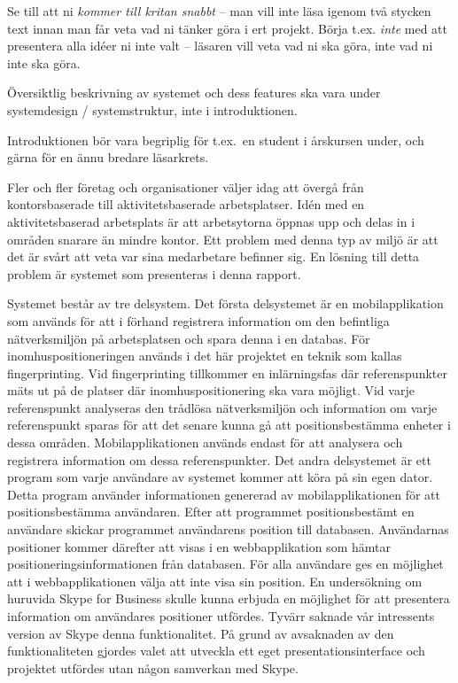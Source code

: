 \documentclass[a4paper,12pt]{article}
\begin{document}
 Se till att ni \emph{kommer till kritan snabbt} – man vill inte läsa igenom två stycken text innan man får veta vad ni tänker göra i ert projekt.  Börja t.ex. \emph{inte} med att presentera alla idéer ni inte valt – läsaren vill veta vad ni ska göra, inte vad ni inte ska göra.

 Översiktlig beskrivning av systemet och dess features ska vara under systemdesign / systemstruktur, inte i introduktionen.

 Introduktionen bör vara begriplig för t.ex.~en student i årskursen under, och gärna för en ännu bredare läsarkrets.
 \fi

 Fler och fler företag och organisationer väljer idag att övergå från kontorsbaserade till aktivitetsbaserade arbetsplatser. Idén med en aktivitetsbaserad arbetsplats är att arbetsytorna öppnas upp och delas in i områden snarare än mindre kontor. Ett problem med denna typ av miljö är att det är svårt att veta var sina medarbetare befinner sig. En lösning till detta problem är systemet som presenteras i denna rapport.


 Systemet består av tre delsystem. Det första delsystemet är en mobilapplikation som används för att i förhand registrera information om den befintliga nätverksmiljön på arbetsplatsen och spara denna i en databas. För inomhuspositioneringen används i det här projektet en teknik som kallas fingerprinting. Vid fingerprinting tillkommer en inlärningsfas där referenspunkter mäts ut på de platser där inomhuspositionering ska vara möjligt. Vid varje referenspunkt analyseras den trådlösa nätverksmiljön och information om varje referenspunkt sparas för att det senare kunna gå att positionsbestämma enheter i dessa områden. Mobilapplikationen används endast för att analysera och registrera information om dessa referenspunkter. Det andra delsystemet är ett program som varje användare av systemet kommer att köra på sin egen dator. Detta program använder informationen genererad av mobilapplikationen för att positionsbestämma användaren. Efter att programmet positionsbestämt en användare skickar programmet användarens position till databasen. Användarnas positioner kommer därefter att visas i en webbapplikation som hämtar positioneringsinformationen från databasen.
 För alla användare ges en möjlighet att i webbapplikationen välja att inte visa sin position.
 En undersökning om huruvida Skype for Business skulle kunna erbjuda en möjlighet för att presentera information om användares positioner utfördes. Tyvärr saknade vår intressents version av Skype denna funktionalitet. På grund av avsaknaden av den funktionaliteten gjordes valet att utveckla ett eget presentationsinterface och projektet utfördes utan någon samverkan med Skype.
\end{document}
